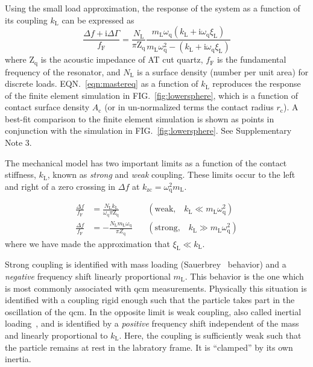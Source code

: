 \documentclass[floatfix,superscriptaddress,a4paper,twocolumn]{revtex4-1}
\newcommand{\Figure}[1]{FIG.~\ref{#1}}
\newcommand{\Equation}[1]{EQN.~\ref{#1}}
\newcommand{\mi}{{\mathrm{i}}}
\newcommand{\df}{\Delta\!f}
\newcommand{\dg}{\Delta\Gamma}
\newcommand{\xil}{\xi_\mathrm{L}}
\newcommand{\kl}{k_\mathrm{L}}
\newcommand{\ml}{m_\mathrm{L}}
\newcommand{\omegaq}{\omega_\mathrm{q}}
\begin{document}
Using the small load approximation, the response of the system as a
function of its coupling $\kl$ can be expressed
as~\cite{steinem2007piezoelectric}
\begin{equation}
  \frac{\df + \mi \dg}{f_\mathrm{F}} = \frac{N_\mathrm{L}}{\pi
    \mathrm{Z}_\mathrm{q}}
  \frac{\ml \omegaq \left( \kl + \mi
    \omegaq \xil\right) }
  {\ml \omegaq^2 - \left(\kl + \mi
    \omegaq \xil\right)}
  \label{eqn:mastereq}
\end{equation}
where $\mathrm{Z}_\mathrm{q}$ is the acoustic impedance of AT cut quartz,
$f_\mathrm{F}$ is the fundamental frequency of the resonator, and
$N_\mathrm{L}$ is a surface density (number per unit area) for discrete
loads.  \Equation{eqn:mastereq} as a function of $\kl$ reproduces the
response of the finite element simulation in \Figure{fig:lowersphere},
which is a function of contact surface density $A_\mathrm{c}$ (or in
un-normalized terms the contact radius $r_\mathrm{c}$).  A best-fit comparison to
the finite element simulation is shown as points in conjunction with the simulation
in \Figure{fig:lowersphere}.  See Supplementary Note 3.

The mechanical model has two important limits as a function of the contact
stiffness, $\kl$, known as \textit{strong} and \textit{weak}
coupling.  These limits occur to the left and right of a zero crossing in $\df$ at
$k_\mathrm{zc}=\omegaq^2 \ml$.

\vspace{-\baselineskip}
\vspace{-\parskip}
\begin{align}
  \frac{\df}{f_\mathrm{F}} & =
  \frac{N_\mathrm{L} \kl}
  {\omegaq\pi \mathrm{Z}_\mathrm{q}}
                           & \,                     & \left(\text{weak,}\quad \kl\ll \ml
  \omegaq^2\right)
  \label{eqn:couplinguy1}
  \\
  \frac{\df}{f_\mathrm{F}} & =  -\frac{N_\mathrm{L}
    \ml \omegaq}{\pi Z_\mathrm{q}}
                           & \,                     & \left(\text{strong,}\quad \kl\gg \ml
  \omegaq^2\right)
  \label{eqn:couplinguy2}
\end{align}
where we have made the approximation that
$\xil\ll\kl$.~\cite{steinem2007piezoelectric}


Strong coupling is identified with mass loading
(Sauerbrey~\cite{sauerbrey1959verwendung} behavior) and a \textit{negative}
frequency shift linearly proportional $\ml$.  This behavior is the
one which is most commonly associated with \gls{qcm} measurements.  Physically
this situation is identified with a coupling rigid enough such that
the particle takes part in the oscillation of the \gls{qcm}.
In the
opposite limit is weak coupling, also called inertial
loading~\cite{dybwad1985sensitive}, and is identified by a \textit{positive}
frequency shift independent of the mass and linearly proportional
to $\kl$.  Here, the coupling is sufficiently weak such that the particle
remains at rest in the labratory frame.  It is ``clamped'' by its own
inertia.~\cite{du2008role}
\end{document}
